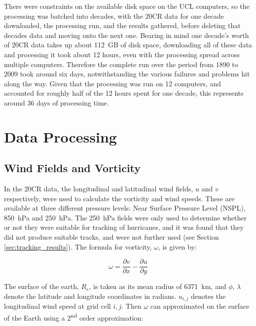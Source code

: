 \documentclass[pdftex,12pt,a4paper]{report}
\newcommand{\ts}{\textsuperscript}
\begin{document}
There were constraints on the available disk space on the UCL computers, so the
processing was batched into decades, with the 20CR data for one decade downloaded, the processing
run, and the results gathered, before deleting that decades data and moving onto the next one.
Bearing in mind one decade's worth of 20CR data takes up about \SI{112}{GB} of disk space,
downloading all of these data and processing it took about 12 hours, even with the processing spread
across multiple computers. Therefore the complete run over the period from 1890 to 2009 took around
six days, notwithstanding the various failures and problems hit along the way. Given that the
processing was run on 12 computers, and accounted for roughly half of the 12 hours spent for one
decade, this represents around 36 days of processing time.

\section{Data Processing}

\subsection{Wind Fields and Vorticity}
\label{sec:vort}

In the 20CR data, the longitudinal and latitudinal wind fields, $u$ and $v$ respectively, were used
to calculate the vorticity and wind speeds. These are available at three different pressure levels:
Near Surface Pressure Level (NSPL), \SI{850}{hPa} and \SI{250}{hPa}. The \SI{250}{hPa} fields were
only used to determine whether or not they were suitable for tracking of hurricanes, and it was
found that they did not produce suitable tracks, and were not further used (see Section
\ref{sec:tracking_results}). The formula for vorticity, $\omega$, is given by:

\begin{equation}
    \omega = \frac{\partial v}{\partial x} - \frac{\partial u}{\partial y}
    \label{eqn:vorticity}
\end{equation}

The surface of the earth, $R_e$, is taken as its mean radius of \SI{6371}{km}, and $\phi$, $\lambda$
denote the latitude and longitude coordinates in radians. $u_{i, j}$ denotes the longitudinal wind
speed at grid cell $i, j$. Then $\omega$ can approximated on the surface of the Earth using a
2\ts{nd} order approximation: 

\end{document}
